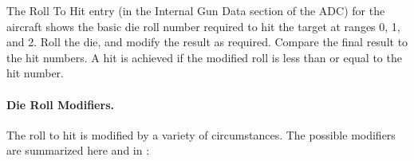 The Roll To Hit entry (in the Internal Gun Data section of the ADC) for the aircraft shows the basic die roll number required to hit the target at ranges 0, 1, and 2. Roll the die, and modify the result as required. Compare the final result to the hit numbers. A hit is achieved if the modified roll is less than or equal to the hit number.
    
\paragraph{Die Roll Modifiers.} 

The roll to hit is modified by a variety of circumstances. The possible modifiers are summarized here and in :



